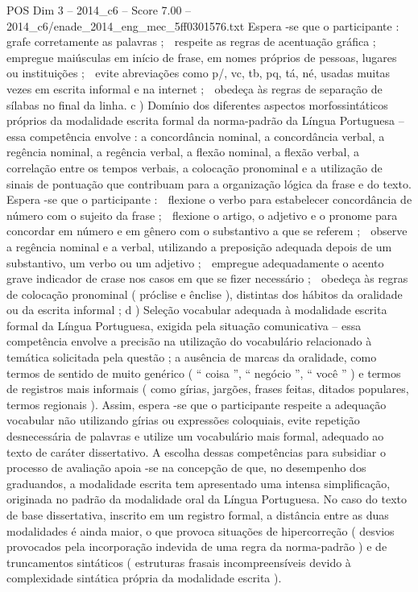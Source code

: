 \begin{textsample}{POS Dim 3 – 2014\_c6 – Score 7.00 – 2014\_c6/enade\_2014\_eng\_mec\_5ff0301576.txt}
Espera -se que o participante :  grafe corretamente as palavras ;  respeite as regras de acentuação gráfica ;  empregue maiúsculas em início de frase, em nomes próprios de pessoas, lugares ou instituições ;  evite abreviações como p/, vc, tb, pq, tá, né, usadas muitas vezes em escrita informal e na internet ;  obedeça às regras de separação de sílabas no final da linha. c ) Domínio dos diferentes aspectos morfossintáticos próprios da modalidade escrita formal da norma-padrão da Língua Portuguesa – essa competência envolve : a concordância nominal, a concordância verbal, a regência nominal, a regência verbal, a flexão nominal, a flexão verbal, a correlação entre os tempos verbais, a colocação pronominal e a utilização de sinais de pontuação que contribuam para a organização lógica da frase e do texto.
Espera -se que o participante :  flexione o verbo para estabelecer concordância de número com o sujeito da frase ;  flexione o artigo, o adjetivo e o pronome para concordar em número e em gênero com o substantivo a que se referem ;  observe a regência nominal e a verbal, utilizando a preposição adequada depois de um substantivo, um verbo ou um adjetivo ;  empregue adequadamente o acento grave indicador de crase nos casos em que se fizer necessário ;  obedeça às regras de colocação pronominal ( próclise e ênclise ), distintas dos hábitos da oralidade ou da escrita informal ; d ) Seleção vocabular adequada à modalidade escrita formal da Língua Portuguesa, exigida pela situação comunicativa – essa competência envolve a precisão na utilização do vocabulário relacionado à temática solicitada pela questão ; a ausência de marcas da oralidade, como termos de sentido de muito genérico ( “ coisa ”, “ negócio ”, “ você ” ) e termos de registros mais informais ( como gírias, jargões, frases feitas, ditados populares, termos regionais ).
Assim, espera -se que o participante respeite a adequação vocabular não utilizando gírias ou expressões coloquiais, evite repetição desnecessária de palavras e utilize um vocabulário mais formal, adequado ao texto de caráter dissertativo.
A escolha dessas competências para subsidiar o processo de avaliação apoia -se na concepção de que, no desempenho dos graduandos, a modalidade escrita tem apresentado uma intensa simplificação, originada no padrão da modalidade oral da Língua Portuguesa.
No caso do texto de base dissertativa, inscrito em um registro formal, a distância entre as duas modalidades é ainda maior, o que provoca situações de hipercorreção ( desvios provocados pela incorporação indevida de uma regra da norma-padrão ) e de truncamentos sintáticos ( estruturas frasais incompreensíveis devido à complexidade sintática própria da modalidade escrita ).

\end{textsample}
